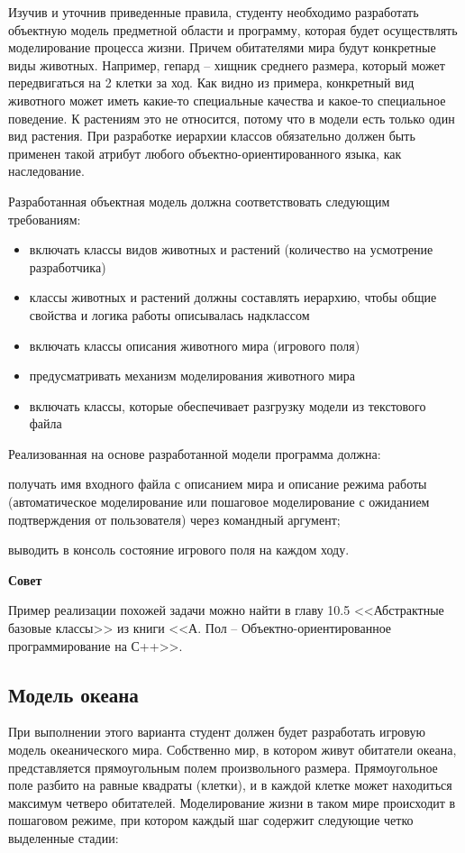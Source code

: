 \documentclass[a4paper,12pt]{article}
\begin{document}
Изучив и уточнив приведенные правила, студенту необходимо разработать
объектную модель предметной области и программу, которая будет
осуществлять моделирование процесса жизни. Причем обитателями мира
будут конкретные виды животных. Например, гепард – хищник среднего
размера, который может передвигаться на 2 клетки за ход. Как видно из
примера, конкретный вид животного может иметь какие-то специальные
качества и какое-то специальное поведение. К растениям это не
относится, потому что в модели есть только один вид растения. При
разработке иерархии классов обязательно должен быть применен такой
атрибут любого объектно-ориентированного языка, как наследование.

Разработанная объектная модель должна соответствовать следующим требованиям:

\begin{itemize}
\item включать классы видов животных и растений (количество на
  усмотрение разработчика)
\item классы животных и растений должны составлять иерархию, чтобы
  общие свойства и логика работы описывалась надклассом
\item включать классы описания животного мира (игрового поля)
\item предусматривать механизм моделирования животного мира
\item включать классы, которые обеспечивает разгрузку модели из
  текстового файла
\end{itemize}

Реализованная на основе разработанной модели программа должна:

получать имя входного файла с описанием мира и описание режима работы
(автоматическое моделирование или пошаговое моделирование с ожиданием
подтверждения от пользователя) через командный аргумент;

выводить в консоль состояние игрового поля на каждом ходу.

\textbf{Совет}

Пример реализации похожей задачи можно найти в главу 10.5
<<Абстрактные базовые классы>> из книги <<А. Пол –
Объектно-ориентированное программирование на С++>>.

\subsection{Модель океана}

При выполнении этого варианта студент должен будет разработать игровую
модель океанического мира. Собственно мир, в котором живут обитатели
океана, представляется прямоугольным полем произвольного
размера. Прямоугольное поле разбито на равные квадраты (клетки), и в
каждой клетке может находиться максимум четверо
обитателей. Моделирование жизни в таком мире происходит в пошаговом
режиме, при котором каждый шаг содержит следующие четко выделенные
стадии:
\end{document}
